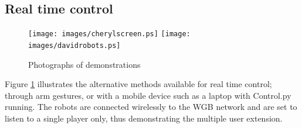 \documentclass[12pt,a4,notitlepage]{report}
\renewcommand{\_}{\texttt{\symbol{95}}}
\newcommand{\<}{\texttt{\symbol{60}}}
\renewcommand{\>}{\texttt{\symbol{62}}}
\begin{document}
\subsection{Real time control}
\begin{figure}
\centering
\texttt{[image: images/cherylscreen.ps]}
\texttt{[image: images/davidrobots.ps]}
\caption{Photographs of demonstrations}
\label{demonstrations}
\end{figure}

Figure \ref{demonstrations} illustrates the alternative methods available for real time control; through arm gestures, or with a mobile device such as a laptop with Control.py running. The robots are connected wirelessly to the WGB network and are set to listen to a single player only, thus demonstrating the multiple user extension. 
\end{document}
